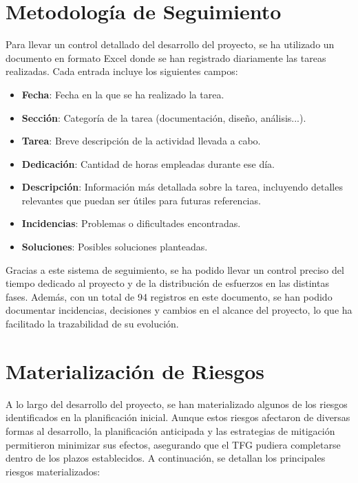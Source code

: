 \section{Metodología de Seguimiento}

Para llevar un control detallado del desarrollo del proyecto, se ha utilizado un documento en formato Excel donde se han registrado diariamente las tareas realizadas. Cada entrada incluye los siguientes campos:

\begin{itemize}\setlength{\itemsep}{0pt}
    \item \textbf{Fecha}: Fecha en la que se ha realizado la tarea.
    \item \textbf{Sección}: Categoría de la tarea (documentación, diseño, análisis...).
    \item \textbf{Tarea}: Breve descripción de la actividad llevada a cabo.
    \item \textbf{Dedicación}: Cantidad de horas empleadas durante ese día.
    \item \textbf{Descripción}: Información más detallada sobre la tarea, incluyendo detalles relevantes que puedan ser útiles para futuras referencias.
    \item \textbf{Incidencias}: Problemas o dificultades encontradas.
    \item \textbf{Soluciones}: Posibles soluciones planteadas.
\end{itemize}

Gracias a este sistema de seguimiento, se ha podido llevar un control preciso del tiempo dedicado al proyecto y de la distribución de esfuerzos en las distintas fases. Además, con un total de 94 registros en este documento, se han podido documentar incidencias, decisiones y cambios en el alcance del proyecto, lo que ha facilitado la trazabilidad de su evolución.


\section{Materialización de Riesgos} \label{sec:materializacion_riesgos}

A lo largo del desarrollo del proyecto, se han materializado algunos de los riesgos identificados en la planificación inicial. Aunque estos riesgos afectaron de diversas formas al desarrollo, la planificación anticipada y las estrategias de mitigación permitieron minimizar sus efectos, asegurando que el TFG pudiera completarse dentro de los plazos establecidos. A continuación, se detallan los principales riesgos materializados:

